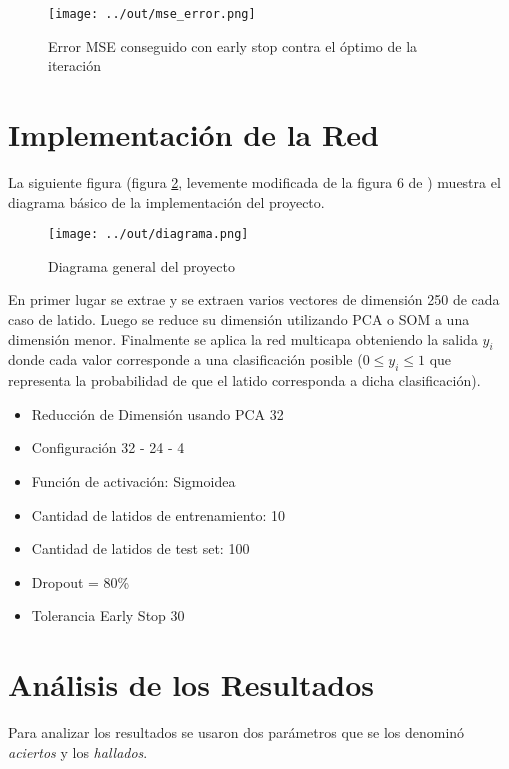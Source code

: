 \documentclass[conference]{IEEEtran}
\theoremstyle{definition}
\begin{document}
\begin{figure}[H]
	\centering
	\texttt{[image: ../out/mse\_error.png]}
	\caption{Error MSE conseguido con early stop contra el \'{o}ptimo de la iteraci\'{o}n}
	\label{fig_mse_error}
\end{figure}

\section{Implementaci\'{o}n de la Red} \label{sec_config}

La siguiente figura (figura \ref{fig_diagram}, levemente modificada de la figura 6 de \cite{NN_HEALTHCARE}) muestra el diagrama b\'{a}sico de la implementaci\'{o}n del proyecto.

\begin{figure}[H]
	\centering
	\texttt{[image: ../out/diagrama.png]}
	\caption{Diagrama general del proyecto}
	\label{fig_diagram}
\end{figure}

En primer lugar se extrae y se extraen varios vectores de dimensi\'{o}n 250 de cada caso de latido. 
Luego se reduce su dimensi\'{o}n utilizando PCA o SOM a una dimensi\'{o}n menor.
Finalmente se aplica la red multicapa obteniendo la salida \(y_i\) donde cada valor corresponde a una clasificaci\'{o}n posible (\(0 \le y_i \le 1\) que representa la probabilidad de que el latido corresponda a dicha clasificaci\'{o}n). 

\begin{itemize}
	\item Reducci\'{o}n de Dimensi\'{o}n usando PCA 32
	\item Configuraci\'{o}n 32 - 24 - 4
	\item Funci\'{o}n de activaci\'{o}n: Sigmoidea
	\item Cantidad de latidos de entrenamiento: 10
	\item Cantidad de latidos de test set: 100
	\item Dropout = 80\%
	\item Tolerancia Early Stop 30
\end{itemize}

\section{An\'{a}lisis de los Resultados} \label{sec_analisis_resultados}

Para analizar los resultados se usaron dos par\'{a}metros que se los denomin\'{o} \textit{aciertos} y los \textit{hallados}. 
\end{document}
